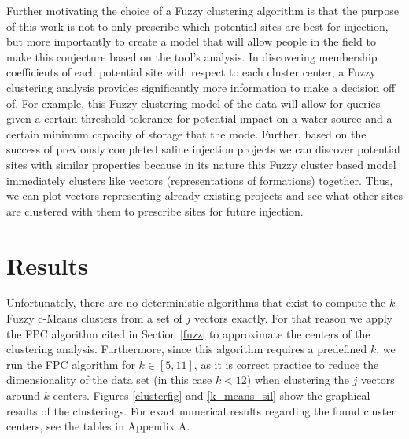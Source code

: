 \documentclass[letterpaper, 12pt]{article}
\begin{document}
\par Further motivating the choice of a Fuzzy clustering algorithm is that the purpose of this work is not to only prescribe which potential sites are best for injection, but more importantly to create a model that will allow people in the field to make this conjecture based on the tool's analysis. In discovering membership coefficients of each potential site with respect to each cluster center, a Fuzzy clustering analysis provides significantly more information to make a decision off of. For example, this Fuzzy clustering model of the data will allow for queries given a certain threshold tolerance for potential impact on a water source and a certain minimum capacity of storage that the mode. Further, based on the success of previously completed saline injection projects we can discover potential sites with similar properties because in its nature this Fuzzy cluster based model immediately clusters like vectors (representations of formations) together. Thus, we can plot vectors representing already existing projects and see what other sites are clustered with them to prescribe sites for future injection. 



\section{Results}
Unfortunately, there are no deterministic algorithms that exist to compute the $k$ Fuzzy c-Means clusters from a set of $j$ vectors exactly. For that reason we apply the FPC algorithm cited in Section \ref{fuzz} to approximate the centers of the clustering analysis. Furthermore, since this algorithm requires a predefined $k$, we run the FPC algorithm for $k \in [5,11]$, as it is correct practice to reduce the dimensionality of the data set (in this case $k < 12$) when clustering the $j$ vectors around $k$ centers. Figures \ref{clusterfig} and \ref {k_means_sil} show the graphical results of the clusterings. For exact numerical results regarding the found cluster centers, see the tables in Appendix A. 
\end{document}
